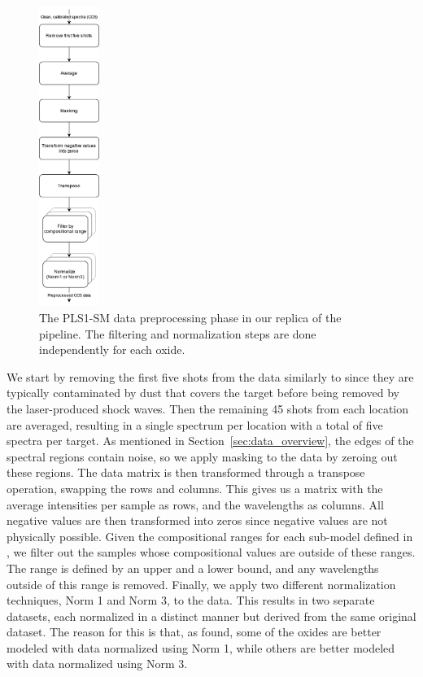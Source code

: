 \begin{figure}
	\centering
	\includegraphics[width=0.175\textwidth]{images/pls_preprocessing.png}
	\caption{The PLS1-SM data preprocessing phase in our replica of the pipeline. The filtering and normalization steps are done independently for each oxide.}
	\label{fig:pls_data_preprocessing}
\end{figure}
\noindent
We start by removing the first five shots from the data similarly to \citet{cleggRecalibrationMarsScience2017} since they are typically contaminated by dust that covers the target before being removed by the laser-produced shock waves.
Then the remaining 45 shots from each location are averaged, resulting in a single spectrum per location with a total of five spectra per target.
As mentioned in Section~\ref{sec:data_overview}, the edges of the spectral regions contain noise, so we apply masking to the data by zeroing out these regions.
The data matrix is then transformed through a transpose operation, swapping the rows and columns.
This gives us a matrix with the average intensities per sample as rows, and the wavelengths as columns.
All negative values are then transformed into zeros since negative values are not physically possible.
Given the compositional ranges for each sub-model defined in \citet{andersonImprovedAccuracyQuantitative2017}, we filter out the samples whose compositional values are outside of these ranges.
The range is defined by an upper and a lower bound, and any wavelengths outside of this range is removed.
Finally, we apply two different normalization techniques, Norm 1 and Norm 3, to the data.
This results in two separate datasets, each normalized in a distinct manner but derived from the same original dataset.
The reason for this is that, as \citet{cleggRecalibrationMarsScience2017} found, some of the oxides are better modeled with data normalized using Norm 1, while others are better modeled with data normalized using Norm 3.

